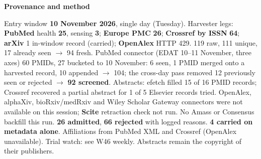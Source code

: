 \documentclass[10pt]{article}
\begin{document}
\begin{keybox}
{\sffamily\bfseries\footnotesize\color{Deep}Provenance and method}\\[1.2mm]
{\fontsize{7.2}{8.8}\selectfont
Entry window \textbf{10 November 2026}, single day (Tuesday). Harvester legs: \textbf{PubMed} health \textbf{25}, sensing \textbf{3}; \textbf{Europe PMC} \textbf{26}; \textbf{Crossref by ISSN} \textbf{64}; \textbf{arXiv} 1 in-window record (carried); \textbf{OpenAlex} HTTP 429. 119 raw, 111 unique, 17 already seen $\rightarrow$ 94 fresh. PubMed connector (EDAT 10--11 November, three axes) 60 PMIDs, 27 bucketed to 10 November: 6 seen, 1 PMID merged onto a harvested record, 10 appended $\rightarrow$ 104; the cross-day pass removed 12 previously seen or rejected $\rightarrow$ \textbf{92 screened}. Abstracts: efetch filled 15 of 16 PMID records; Crossref recovered a partial abstract for 1 of 5 Elsevier records tried.
OpenAlex, alphaXiv, bioRxiv/medRxiv and Wiley Scholar Gateway connectors were not available on this session; \textbf{Scite} retraction check not run. No Amass or Consensus backfill this run.
\textbf{26 admitted}, \textbf{66 rejected} with logged reasons. \textbf{4 carried on metadata alone}. Affiliations from PubMed XML and Crossref (OpenAlex unavailable). Trial watch: see W46 weekly.
Abstracts remain the copyright of their publishers.\par}
\end{keybox}
\end{document}
